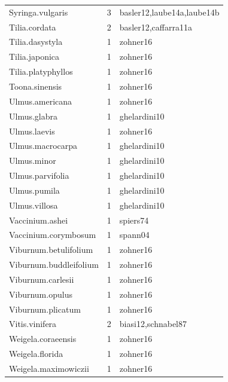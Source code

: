 \documentclass{article}
\begin{document}
\begin{footnotesize}
\begin{table}[ht]
\begin{tabular}{|p{}|p{}|p{}|}
  Syringa.vulgaris &   3 & basler12,laube14a,laube14b \\ 
  Tilia.cordata &   2 & basler12,caffarra11a \\ 
  Tilia.dasystyla &   1 & zohner16 \\ 
  Tilia.japonica &   1 & zohner16 \\ 
  Tilia.platyphyllos &   1 & zohner16 \\ 
  Toona.sinensis &   1 & zohner16 \\ 
  Ulmus.americana &   1 & zohner16 \\ 
  Ulmus.glabra &   1 & ghelardini10 \\ 
  Ulmus.laevis &   1 & zohner16 \\ 
  Ulmus.macrocarpa &   1 & ghelardini10 \\ 
  Ulmus.minor &   1 & ghelardini10 \\ 
  Ulmus.parvifolia &   1 & ghelardini10 \\ 
  Ulmus.pumila &   1 & ghelardini10 \\ 
  Ulmus.villosa &   1 & ghelardini10 \\ 
  Vaccinium.ashei &   1 & spiers74 \\ 
  Vaccinium.corymbosum &   1 & spann04 \\ 
  Viburnum.betulifolium &   1 & zohner16 \\ 
  Viburnum.buddleifolium &   1 & zohner16 \\ 
  Viburnum.carlesii &   1 & zohner16 \\ 
  Viburnum.opulus &   1 & zohner16 \\ 
  Viburnum.plicatum &   1 & zohner16 \\ 
  Vitis.vinifera &   2 & biasi12,schnabel87 \\ 
  Weigela.coraeensis &   1 & zohner16 \\ 
  Weigela.florida &   1 & zohner16 \\ 
  Weigela.maximowiczii &   1 & zohner16 \\ 
  \end{tabular}
\endgroup
\end{table}



\end{footnotesize}
\end{document}
